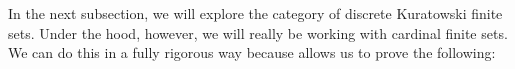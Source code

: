 In the next subsection, we will explore the category of discrete Kuratowski finite
sets.
Under the hood, however, we will really be working with cardinal finite sets.
We can do this in a fully rigorous way because
 allows us to prove the following:

